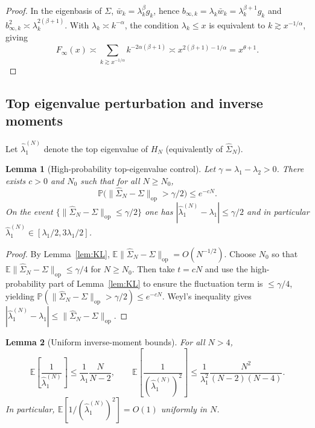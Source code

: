 \documentclass[11pt]{article}
\newtheorem{lemma}{Lemma}
\begin{document}
\begin{proof}
In the eigenbasis of $\Sigma$, $\bar w_k=\lambda_k^\beta g_k$, hence
$b_{\infty,k}=\lambda_k\bar w_k=\lambda_k^{\beta+1}g_k$ and $b_{\infty,k}^2\asymp \lambda_k^{2(\beta+1)}$.
With $\lambda_k\asymp k^{-\alpha}$, the condition $\lambda_k\le x$ is equivalent to $k\gtrsim x^{-1/\alpha}$, giving
\[
F_\infty(x)\asymp \sum_{k\gtrsim x^{-1/\alpha}} k^{-2\alpha(\beta+1)}
\asymp x^{2(\beta+1)-1/\alpha}=x^{\theta+1}.
\]
\end{proof}

\subsection{Top eigenvalue perturbation and inverse moments}

Let $\widehat\lambda_1^{(N)}$ denote the top eigenvalue of $H_N$ (equivalently of $\widehat\Sigma_N$).

\begin{lemma}[High-probability top-eigenvalue control]\label{lem:top-eig}
Let $\gamma=\lambda_1-\lambda_2>0$. There exists $c>0$ and $N_0$ such that for all $N\ge N_0$,
\[
\mathbb P\big(\|\widehat\Sigma_N-\Sigma\|_{\mathrm{op}}>\gamma/2\big)\le e^{-cN}.
\]
On the event $\{\|\widehat\Sigma_N-\Sigma\|_{\mathrm{op}}\le\gamma/2\}$ one has
$|\widehat\lambda_1^{(N)}-\lambda_1|\le \gamma/2$ and in particular
$\widehat\lambda_1^{(N)}\in[\lambda_1/2,3\lambda_1/2]$.
\end{lemma}

\begin{proof}
By Lemma~\ref{lem:KL}, $\mathbb E\|\widehat\Sigma_N-\Sigma\|_{\mathrm{op}}=O(N^{-1/2})$.
Choose $N_0$ so that $\mathbb E\|\widehat\Sigma_N-\Sigma\|_{\mathrm{op}}\le\gamma/4$ for $N\ge N_0$.
Then take $t=cN$ and use the high-probability part of Lemma~\ref{lem:KL} to ensure the fluctuation term is $\le\gamma/4$,
yielding $\mathbb P(\|\widehat\Sigma_N-\Sigma\|_{\mathrm{op}}>\gamma/2)\le e^{-cN}$.
Weyl's inequality gives $|\widehat\lambda_1^{(N)}-\lambda_1|\le\|\widehat\Sigma_N-\Sigma\|_{\mathrm{op}}$.
\end{proof}

\begin{lemma}[Uniform inverse-moment bounds]\label{lem:inv-mom-bdd}
For all $N>4$,
\[
\mathbb E\!\left[\frac{1}{\widehat\lambda_1^{(N)}}\right]\le \frac{1}{\lambda_1}\frac{N}{N-2},
\qquad
\mathbb E\!\left[\frac{1}{(\widehat\lambda_1^{(N)})^2}\right]\le \frac{1}{\lambda_1^2}\frac{N^2}{(N-2)(N-4)}.
\]
In particular, $\mathbb E[1/(\widehat\lambda_1^{(N)})^2]=O(1)$ uniformly in $N$.
\end{lemma}
\end{document}
